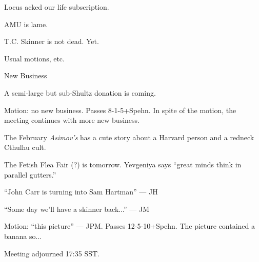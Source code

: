 \documentclass[12pt]{article}
\begin{document}
Locus acked our life subscription.

AMU is lame.

T.C. Skinner is not dead.  Yet.

\vskip 12pt

Usual motions, etc.

\centerline{New Business}

A semi-large but sub-Shultz donation is coming.

Motion: no new business.  Passes \hbox{8-1-5+Spehn}.  In spite of the
motion, the meeting continues with more new business.

The February {\it Asimov's} has a cute story about a Harvard person
and a redneck Cthulhu cult.

The Fetish Flea Fair (?) is tomorrow.
Yevgeniya says ``great minds think in parallel gutters.''

``John Carr is turning into Sam Hartman'' --- JH

``Some day we'll have a skinner back...'' --- JM

Motion: ``this picture'' --- JPM.  Passes \hbox{12-5-10+Spehn}.
The picture contained a banana so...

\vskip 12pt


Meeting adjourned 17:35 SST.
\end{document}
